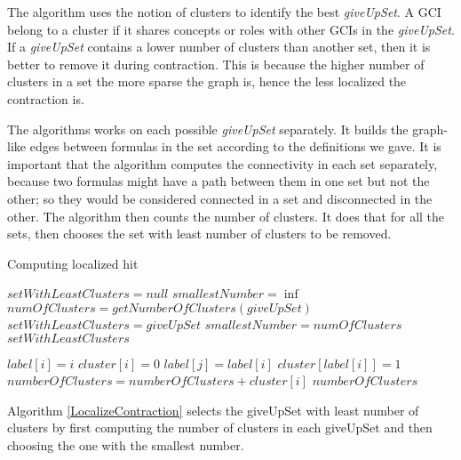 The algorithm uses the notion of clusters to identify the best \textit{giveUpSet}. A GCI belong to a cluster if it shares concepts or roles with other GCIs in the \textit{giveUpSet}. If a \textit{giveUpSet} contains a lower number of clusters than another set, then it is better to remove it during contraction. This is because the higher number of clusters in a set the more sparse the graph is, hence the less localized the contraction is. 

The algorithms works on each possible \textit{giveUpSet} separately. It builds the graph-like edges between formulas in the set according to the definitions we gave. It is important that the algorithm computes the connectivity in each set separately, because two formulas might have a path between them in one set but not the other; so they would be considered connected in a set and disconnected in the other. The algorithm then counts the number of clusters. It does that for all the sets, then chooses the set with least number of clusters to be removed.

\begin{algorithm}
\caption{Computing localized hit}
\label{LocalizeContraction}
\begin{algorithmic}[1]
\State $setWithLeastClusters = null$
\State $smallestNumber = \inf$
\State $numOfClusters = getNumberOfClusters(giveUpSet)$
\State $setWithLeastClusters = giveUpSet$
\State $smallestNumber = numOfClusters$
\EndIf
\EndFor
\State \Return $setWithLeastClusters$
\EndFunction
\end{algorithmic}


\begin{algorithmic}[1]
\State $label[i]=i$
\EndFor
{}
\State $cluster[i]=0$
\EndFor
{}
\State $label[j] = label[i]$
\EndIf
\EndFor
\EndFor
{}
\State $cluster[label[i]]=1$
\EndFor
{}
\State $numberOfClusters = numberOfClusters + cluster[i]$
\EndFor 
\State \Return $numberOfClusters$
\EndFunction
\end{algorithmic}
\end{algorithm}

Algorithm \ref{LocalizeContraction} selects the giveUpSet with least number of clusters by first computing the number of clusters in each giveUpSet and then choosing the one with the smallest number.

